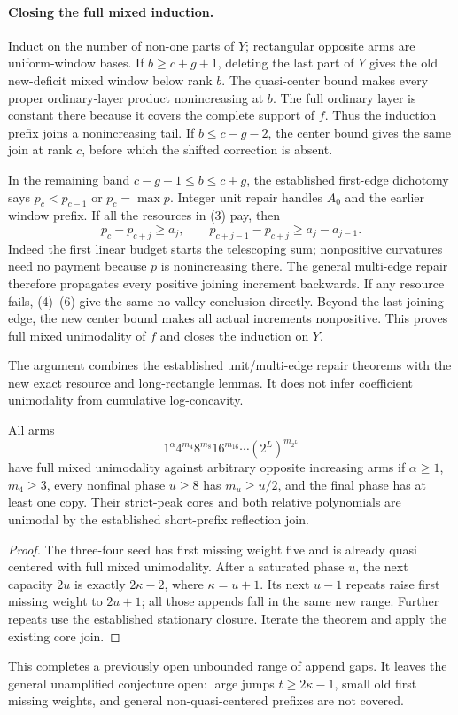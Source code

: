 \paragraph{Closing the full mixed induction.}
Induct on the number of non-one parts of $Y$; rectangular
opposite arms are uniform-window bases.
If $b\ge c+g+1$, deleting the last part of $Y$ gives
the old new-deficit mixed window below rank $b$.
The quasi-center bound makes every proper ordinary-layer
product nonincreasing at $b$. The full ordinary layer is
constant there because it covers the complete support of $f$.
Thus the induction prefix joins a nonincreasing tail.
If $b\le c-g-2$, the center bound gives the same join at
rank $c$, before which the shifted correction is absent.

In the remaining band $c-g-1\le b\le c+g$, the established
first-edge dichotomy says $p_c<p_{c-1}$ or $p_c=\max p$.
Integer unit repair handles $A_0$ and the earlier window
prefix. If all the resources in (3) pay, then
\[
 p_c-p_{c+j}\ge a_j,\qquad
 p_{c+j-1}-p_{c+j}\ge a_j-a_{j-1}.
\]
Indeed the first linear budget starts the telescoping sum;
nonpositive curvatures need no payment because $p$ is
nonincreasing there. The general multi-edge repair therefore
propagates every positive joining increment backwards.
If any resource fails, (4)--(6) give the same no-valley
conclusion directly. Beyond the last joining edge, the
new center bound makes all actual increments nonpositive.
This proves full mixed unimodality of $f$ and closes the
induction on $Y$.

The argument combines the established unit/multi-edge repair
theorems with the new exact resource and long-rectangle
lemmas. It does not infer coefficient unimodality from
cumulative log-concavity.

\begin{corollary}
All arms
\[
 1^\alpha4^{m_4}8^{m_8}16^{m_{16}}\cdots(2^L)^{m_{2^L}}
\]
have full mixed unimodality against arbitrary opposite
increasing arms if $\alpha\ge1$, $m_4\ge3$, every nonfinal
phase $u\ge8$ has $m_u\ge u/2$, and the final phase has
at least one copy. Their strict-peak cores and both
relative polynomials are unimodal by the established
short-prefix reflection join.
\end{corollary}
\begin{proof}
The three-four seed has first missing weight five and is
already quasi centered with full mixed unimodality.
After a saturated phase $u$, the next capacity $2u$ is
exactly $2\kappa-2$, where $\kappa=u+1$.
Its next $u-1$ repeats raise first missing weight to $2u+1$;
all those appends fall in the same new range. Further
repeats use the established stationary closure.
Iterate the theorem and apply the existing core join.
\end{proof}

This completes a previously open unbounded range of append
gaps. It leaves the general unamplified conjecture open:
large jumps $t\ge2\kappa-1$, small old first missing weights,
and general non-quasi-centered prefixes are not covered.
